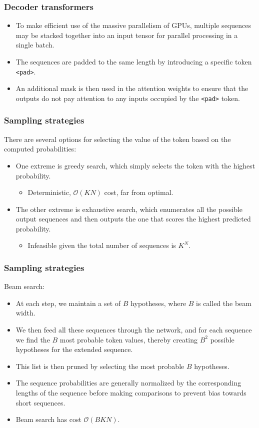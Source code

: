 \documentclass{beamer}
\begin{document}
\begin{frame}
    \frametitle{Decoder transformers}
    \begin{itemize}
        \item To make efficient use of the massive parallelism of GPUs, multiple sequences may be stacked together into an input tensor for parallel processing in a single batch.
        \item The sequences are padded to the same length by introducing a specific token {\tt <pad>}.
        \item An additional mask is then used in the attention weights to ensure that the outputs do not pay attention to any inputs occupied by the {\tt <pad>} token.
    \end{itemize}
\end{frame}

\begin{frame}
    \frametitle{Sampling strategies}
    There are several options for selecting the value of the token based on the computed probabilities:
    \begin{itemize}
        \item One extreme is greedy search, which simply selects the token with the highest probability.
        \begin{itemize}
            \item Deterministic, $\mathcal{O}(KN)$ cost, far from optimal.
        \end{itemize}
        \item The other extreme is exhaustive search, which enumerates all the possible output sequences and then outputs the one that scores the highest predicted probability.
        \begin{itemize}
            \item Infeasible given the total number of sequences is $K^{N}$.
        \end{itemize}
    \end{itemize}
\end{frame}

\begin{frame}
    \frametitle{Sampling strategies}
    Beam search:
    \begin{itemize}
        \item At each step, we maintain a set of $B$ hypotheses, where $B$ is called the beam width.
        \item We then feed all these sequences through the network, and for each sequence we find the $B$ most probable token values, thereby creating $B^{2}$ possible hypotheses for the extended sequence.
        \item This list is then pruned by selecting the most probable $B$ hypotheses.
        \item The sequence probabilities are generally normalized by the corresponding lengths of the sequence before making comparisons to prevent bias towards short sequences.
        \item Beam search has cost $\mathcal{O}(BKN)$.
    \end{itemize}
\end{frame}
\end{document}
